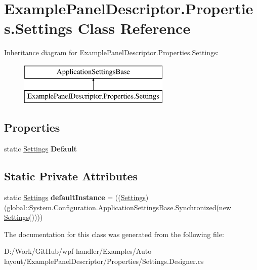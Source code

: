 \hypertarget{class_example_panel_descriptor_1_1_properties_1_1_settings}{}\section{Example\+Panel\+Descriptor.\+Properties.\+Settings Class Reference}
\label{class_example_panel_descriptor_1_1_properties_1_1_settings}
Inheritance diagram for Example\+Panel\+Descriptor.\+Properties.\+Settings\+:\begin{figure}[H]
\begin{center}
\leavevmode
\includegraphics[height=2.000000cm]{df/dfb/class_example_panel_descriptor_1_1_properties_1_1_settings}
\end{center}
\end{figure}
\subsection*{Properties}
\begin{DoxyCompactItemize}
\item 
\mbox{\label{class_example_panel_descriptor_1_1_properties_1_1_settings_af48c01a3ade045b3079affd9e4462189}} 
static \mbox{\hyperlink{class_example_panel_descriptor_1_1_properties_1_1_settings}{Settings}} {\bfseries Default}
\end{DoxyCompactItemize}
\subsection*{Static Private Attributes}
\begin{DoxyCompactItemize}
\item 
\mbox{\label{class_example_panel_descriptor_1_1_properties_1_1_settings_a61f9d664b0e435650a76ca0f5e9d0f32}} 
static \mbox{\hyperlink{class_example_panel_descriptor_1_1_properties_1_1_settings}{Settings}} {\bfseries default\+Instance} = ((\mbox{\hyperlink{class_example_panel_descriptor_1_1_properties_1_1_settings}{Settings}})(global\+::\+System.\+Configuration.\+Application\+Settings\+Base.\+Synchronized(new \mbox{\hyperlink{class_example_panel_descriptor_1_1_properties_1_1_settings}{Settings}}())))
\end{DoxyCompactItemize}


The documentation for this class was generated from the following file\+:\begin{DoxyCompactItemize}
\item 
D\+:/\+Work/\+Git\+Hub/wpf-\/handler/\+Examples/\+Auto layout/\+Example\+Panel\+Descriptor/\+Properties/Settings.\+Designer.\+cs\end{DoxyCompactItemize}
